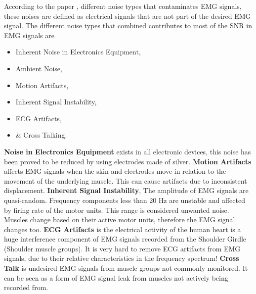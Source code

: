 \documentclass[../main.tex]{subfiles}
\begin{document}
According to the paper \cite{Tech2015}, different noise types that contaminates EMG signals, these noises are defined as electrical signals that are not part of the desired EMG signal.
The different noise types that combined contributes to most of the \gls{SNR} in EMG signals are
\begin{itemize}
\item Inherent Noise in Electronics Equipment,
\item Ambient Noise,
\item Motion Artifacts,
\item Inherent Signal Instability,
\item \gls{ECG} Artifacts,
\item \& Cross Talking.
\end{itemize}

\textbf{Noise in Electronics Equipment} exists in all electronic devices, this noise has been proved to be reduced by using electrodes made of silver.
\textbf{Motion Artifacts} affects EMG signals when the skin and electrodes move in relation to the movement of the underlying muscle.
This can cause artifacts due to inconsistent displacement.
\textbf{Inherent Signal Instability}, The amplitude of EMG signals are quasi-random. Frequency components less than 20 Hz are unstable and affected by firing rate of the motor units. This range is considered unwanted noise. Muscles change based on their active motor units, therefore the EMG signal changes too.
\textbf{ECG Artifacts} is the electrical activity of the human heart is a huge interference component of EMG signals recorded from the Shoulder Girdle (Shoulder muscle groups).
It is very hard to remove ECG artifacts from EMG signals, due to their relative characteristics in the frequency spectrum!
\textbf{Cross Talk} is undesired EMG signals from muscle groups not commonly monitored.
It can be seen as a form of EMG signal leak from muscles not actively being recorded from.

\end{document}
